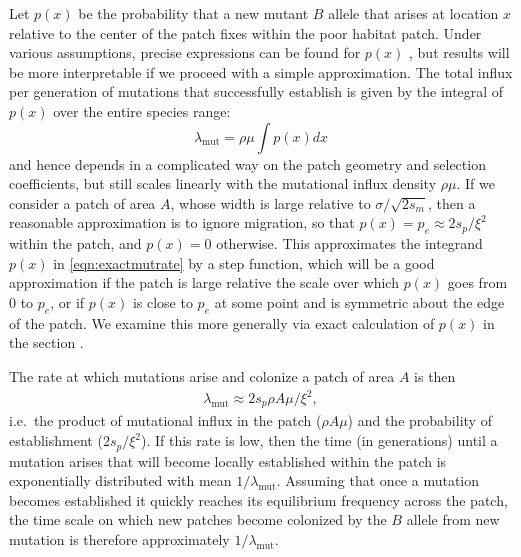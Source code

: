 \documentclass{article}
\newcommand{\citep}[1]{\cite{#1}}
\newcommand{\mutrate}{\lambda_\text{mut}}
\begin{document}
Let $p(x)$ be the probability that a new mutant $B$ allele that arises at location $x$
relative to the center of the patch fixes within the poor habitat patch.
Under various assumptions, precise expressions can be found for $p(x)$ \citep{barton1987establishment},
but results will be more interpretable if we proceed with a simple approximation.
The total influx per generation of mutations that successfully establish is given by the
integral of $p(x)$ over the entire species range:
\begin{equation}
  \mutrate = \rho \mu \int p(x) dx \label{eqn:exactmutrate}
\end{equation}
and hence depends in a complicated way on the patch geometry and selection coefficients,
but still scales linearly with the mutational influx density $\rho \mu$.
If we consider a patch of area $A$, whose width is large relative to $\sigma/\sqrt{2s_m}$, 
then a reasonable approximation is to ignore migration, 
so that $p(x) = p_e \approx 2 s_p / \xi^2$ within the patch, and $p(x) = 0$ otherwise.
This approximates the integrand $p(x)$ in \eqref{eqn:exactmutrate} by a step function,
which will be a good approximation if the patch is large relative the scale over which $p(x)$ goes from 0 to $p_e$,
or if $p(x)$ is close to $p_e$ at some point and is symmetric about the edge of the patch. 
We examine this more generally via exact calculation of $p(x)$ in the section .

The rate at which mutations arise and colonize a patch of area $A$ is then
\begin{align} \label{eqn:mutrate} 
  \mutrate %
  \approx 2 s_p \rho A \mu / \xi^2,  
\end{align}
i.e.\ the product of mutational influx in the patch ($\rho A\mu$) and the probability of establishment ($2s_p/\xi^2$).
If this rate is low, then the time (in generations) until a mutation arises that
will become locally established within the patch is exponentially distributed with mean $1/\mutrate$.  
Assuming that once a mutation becomes established it quickly reaches its equilibrium frequency across the patch, 
the time scale on which new patches become colonized by the $B$ allele from new mutation is therefore approximately $1/\mutrate$.


\end{document}
